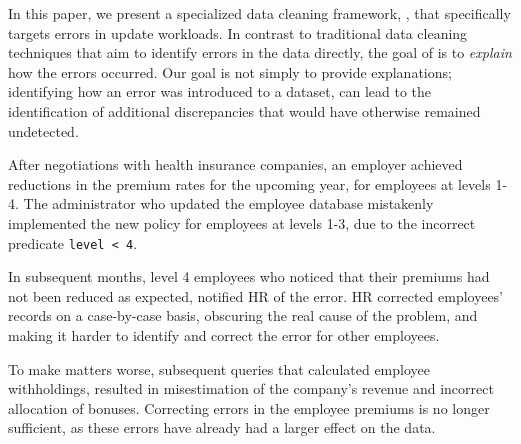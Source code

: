 In this paper, we present a specialized data cleaning framework, \sys, that
specifically targets errors in update workloads. In contrast to traditional
data cleaning techniques that aim to identify errors in the data directly, the
goal of \sys is to \emph{explain} how the errors occurred. Our goal is not
simply to provide explanations; identifying how an error was introduced to a
dataset, can lead to the identification of additional discrepancies that would
have otherwise remained undetected.

\begin{example}
    After negotiations with health insurance companies, an employer achieved
    reductions in the premium rates for the upcoming year, for employees at
    levels 1-4. The administrator who updated the employee database mistakenly
    implemented the new policy for employees at levels 1-3, due to the
    incorrect predicate \texttt{level < 4}.
    
    In subsequent months, level 4 employees who noticed that their premiums
    had not been reduced as expected, notified HR of the error. HR corrected
    employees' records on a case-by-case basis, obscuring the real cause of
    the problem, and making it harder to identify and correct the error for
    other employees.
    
    To make matters worse, subsequent queries that calculated employee
    withholdings, resulted in misestimation of the company's revenue and
    incorrect allocation of bonuses. Correcting errors in the employee
    premiums is no longer sufficient, as these errors have already had a
    larger effect on the data.
    
\end{example}

